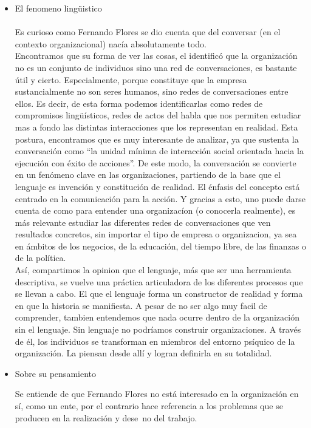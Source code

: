 \begin{itemize}
	\item El fenomeno ling\"uistico\\\\
 Es curioso como Fernando Flores se dio cuenta que del conversar (en el contexto organizacional) nac\'ia absolutamente todo.\\
 Encontramos que su forma de ver las cosas, el identific\'o que la organizaci\'on no es un conjunto de individuos sino una red
 de conversaciones, es bastante \'util y cierto. Especialmente, porque constituye que la empresa sustancialmente no son seres 
humanos, sino redes de conversaciones entre ellos. Es decir, de esta forma podemos identificarlas como redes de compromisos 
ling\"u\'isticos, redes de actos del habla que nos permiten estudiar mas a fondo las distintas interacciones que los representan
 en realidad. Esta postura, encontramos que es muy interesante de analizar, ya que sustenta la conversaci\'on como ``la unidad 
m\'inima de interacci\'on social orientada hacia la ejecuci\'on con \'exito de acciones''. De este modo,
 la conversaci\'on se convierte en un fen\'omeno clave en las organizaciones, partiendo de la base que el lenguaje es invenci\'on y 
constituci\'on de realidad. El \'enfasis del concepto est\'a centrado en la comunicaci\'on para la acci\'on. Y gracias a esto, uno
 puede darse cuenta de como para entender una organizac\'ion (o conocerla realmente), es m\'as relevante estudiar las diferentes redes
 de conversaciones que ven resultados concretos, sin importar el tipo de empresa o organizacion, ya sea en \'ambitos de los negocios,
 de la educaci\'on, del tiempo libre, de las finanzas o de la pol\'itica.\\

As\'i, compartimos la opinion que el lenguaje, m\'as que ser una herramienta descriptiva, se vuelve una pr\'actica articuladora de los
 diferentes procesos que se llevan a cabo. El que el lenguaje forma un constructor de realidad y forma en que la historia se manifiesta.
 A pesar de no ser algo muy facil de comprender, tambien entendemos que nada ocurre dentro de la organizaci\'on sin el lenguaje. Sin 
lenguaje no podr\'iamos construir organizaciones. A trav\'es de \'el, los individuos se transforman en miembros del entorno ps\'iquico 
de la organizaci\'on. La piensan desde all\'i y logran definirla en su totalidad.\\

	\item Sobre su pensamiento

Se entiende de que Fernando Flores  no est\'a interesado en la organizaci\'on en s\'i, 
como un ente, por el contrario hace referencia a los problemas que se producen en la realizaci\'on y dese~no del trabajo.


\end{itemize}
